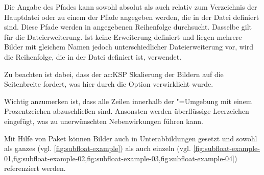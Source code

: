 Die Angabe des Pfades kann sowohl absolut als auch relativ
zum Verzeichnis der Hauptdatei oder zu einem der Pfade angegeben werden,
die in der Datei  definiert sind.
Diese Pfade werden in angegebenen Reihenfolge durchsucht.
Dasselbe gilt für die Dateierweiterung.
Ist keine Erweiterung definiert und liegen mehrere Bilder mit gleichem Namen jedoch unterschiedlicher Dateierweiterung vor,
wird die Reihenfolge, die in der Datei  definiert ist, verwendet.

Zu beachten ist dabei, dass der \gls{ac:KSP} Skalierung der Bildern auf die Seitenbreite fordert,
was hier durch die Option  verwirklicht wurde.

Wichtig anzumerken ist, dass alle Zeilen innerhalb der "=Umgebung
mit einem Prozentzeichen abzuschließen sind.
Ansonsten werden überflüssige Leerzeichen eingefügt,
was zu unerwünschten Nebenwirkungen führen kann.

Mit Hilfe von Paket  \cite{Cochran2005} können Bilder auch in
Unterabbildungen gesetzt
und sowohl als ganzes (vgl. \cref{fig:subfloat-example}) als auch einzeln (vgl.
\cref{fig:subfloat-example-01,fig:subfloat-example-02,fig:subfloat-example-03,fig:subfloat-example-04})
referenziert werden.

